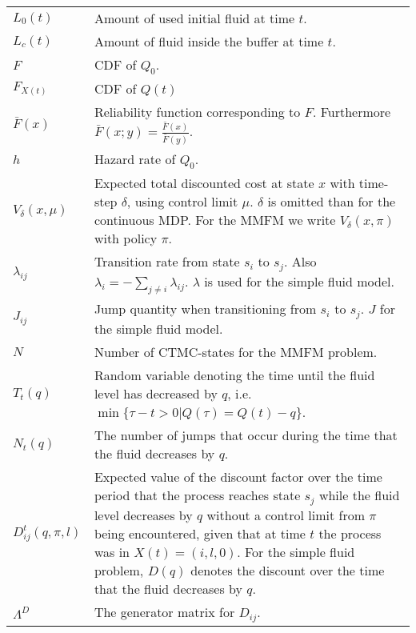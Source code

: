 \documentclass[a4paper]{thesis}
\theoremstyle{definition}
\providecommand{\DIFaddtex}[1]{{\protect\color{blue}\uwave{#1}}} %
\providecommand{\DIFdelbegin}{} %
\providecommand{\DIFaddFL}[1]{\DIFadd{#1}} %
\providecommand{\DIFaddbeginFL}{} %
\providecommand{\DIFdelendFL}{} %
\providecommand{\DIFadd}[1]{\texorpdfstring{\DIFaddtex{#1}}{#1}} %
\newcommand{\DIFscaledelfig}{0.5}
\newlength{\DIFdelgraphicswidth} %
\newlength{\DIFdelgraphicsheight} %
\newcommand{\DIFaddincludegraphics}[2][]{{\color{blue}\fbox{\DIFOincludegraphics[#1]{#2}}}} %
\newcommand{\DIFdelincludegraphics}[2][]{%
	\sbox{\DIFdelgraphicsbox}{\DIFOincludegraphics[#1]{#2}}%
	\settoboxwidth{\DIFdelgraphicswidth}{\DIFdelgraphicsbox} %
	\settoboxtotalheight{\DIFdelgraphicsheight}{\DIFdelgraphicsbox} %
	\scalebox{\DIFscaledelfig}{%
		\parbox[b]{\DIFdelgraphicswidth}{\usebox{\DIFdelgraphicsbox}\\[-\baselineskip] \rule{\DIFdelgraphicswidth}{0em}}\llap{\resizebox{\DIFdelgraphicswidth}{\DIFdelgraphicsheight}{%
				\setlength{\unitlength}{\DIFdelgraphicswidth}%
				\begin{picture}(1,1)%
				\thicklines\linethickness{2pt} %
				{\color[rgb]{1,0,0}\put(0,0){\framebox(1,1){}}}%
				{\color[rgb]{1,0,0}\put(0,0){\line( 1,1){1}}}%
				{\color[rgb]{1,0,0}\put(0,1){\line(1,-1){1}}}%
				\end{picture}%
			}\hspace*{3pt}}} %
} %
\DeclareRobustCommand{\DIFdelbegin}{\DIFOdelbegin \let\includegraphics\DIFdelincludegraphics} %
\DeclareRobustCommand{\DIFaddbeginFL}{\DIFOaddbeginFL \let\includegraphics\DIFaddincludegraphics} %
\DeclareRobustCommand{\DIFdelendFL}{\DIFOaddendFL \let\includegraphics\DIFOincludegraphics} %
\begin{document}
\begin{appendices}
\begin{tabularx}{\linewidth}{l|L}
			$L_0(t)$& Amount of used initial fluid at time $t$.\\
			$L_c(t)$& Amount of fluid inside the buffer at time $t$.\\
			$F$ & CDF of $Q_0$.\\
			$F_{X(t)}$ & CDF of $Q(t)$\\
			$\bar F(x)$& Reliability function corresponding to $F$. Furthermore $\bar F(x;y)=\frac{\bar F(x)}{\bar F(y)}$.\\
			$h$& Hazard rate of $Q_0$.\\                       
			$V_\delta(x,\mu)$ & Expected total discounted cost at state $x$ with time-step $\delta$, using control limit $\mu$. $\delta$ is omitted than for the continuous MDP. For the MMFM we write $V_\delta(x,\pi)$ with policy $\pi$.            \\
			$\lambda_{ij}$& Transition rate from state $s_i$ to $s_j$. Also $\lambda_i=-\sum_{j\neq i}\lambda_{ij}$. $\lambda$ is used for the simple fluid model.\\
			$J_{ij}$& Jump quantity when transitioning from $s_i$ to $s_j$. $J$ for the simple fluid model.\\
			$N$& Number of CTMC-states for the MMFM problem.\\
			$T_t(q)$&Random variable denoting the time until the fluid level has decreased by $q$, i.e. $\min\{\tau-t>0|Q(\tau)=Q(t)-q\}$.\\
			$N_t(q)$&The number of jumps that occur during the time that the fluid decreases by $q$.\\
			$D_{ij}^t(q,\pi,l)$&Expected value of the discount factor over the time period that the process reaches state $s_j$ while the fluid level decreases by $q$ without a control limit from $\pi$ being encountered, given that at time $t$ the process was in $X(t)= (i,l,0)$. For the simple fluid problem, $D(q)$ denotes the discount over the time that the fluid decreases by $q$.\\
			$\Lambda^D$&The generator matrix for $D_{ij}$.\\
		\end{tabularx}

\end{appendices}
\end{document}
